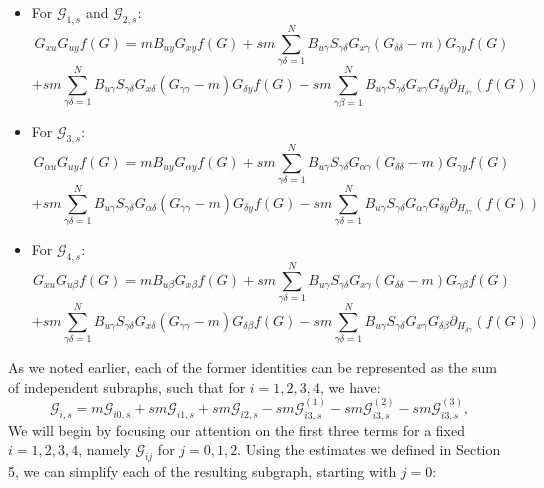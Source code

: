 \documentclass[11pt]{article}
\begin{document}
\begin{itemize}
\item For $\mathcal{G}_{1, s}$ and $\mathcal{G}_{2, s}$: \begin{equation*}
G_{xu}G_{uy}f(G) = mB_{uy}G_{xy} f(G) + sm\sum_{\gamma\delta=1}^N B_{u\gamma} S_{\gamma\delta} G_{x\gamma}(G_{\delta\delta}-m)G_{\gamma y} f(G)
\end{equation*}
$$+sm\sum_{\gamma\delta=1}^N B_{u\gamma} S_{\gamma\delta} G_{x\delta}(G_{\gamma\gamma}-m)G_{\delta y}f(G)-sm\sum_{\gamma\beta=1}^N B_{u\gamma}S_{\gamma\delta}G_{x\gamma}G_{\delta y}\partial_{H_{\delta \gamma}}(f(G))$$
\item For $\mathcal{G}_{3, s}$:
\begin{equation*}
G_{\alpha u}G_{uy}f(G) = mB_{uy}G_{\alpha y} f(G) + sm\sum_{\gamma\delta=1}^N B_{u\gamma} S_{\gamma\delta} G_{\alpha\gamma}(G_{\delta\delta}-m)G_{\gamma y} f(G)
\end{equation*}
$$+sm\sum_{\gamma\delta=1}^N B_{u\gamma} S_{\gamma\delta} G_{\alpha\delta}(G_{\gamma\gamma}-m)G_{\delta y}f(G)-sm\sum_{\gamma\delta=1}^N B_{u\gamma}S_{\gamma\delta}G_{\alpha\gamma}G_{\delta y}\partial_{H_{\delta \gamma}}(f(G))$$
\item For $\mathcal{G}_{4, s}$:
\begin{equation*}
G_{xu}G_{u\beta}f(G) = mB_{u\beta}G_{x\beta} f(G) + sm\sum_{\gamma\delta=1}^N B_{u\gamma} S_{\gamma\delta} G_{x\gamma}(G_{\delta\delta}-m)G_{\gamma \beta} f(G)
\end{equation*}
$$+sm\sum_{\gamma\delta=1}^N B_{u\gamma} S_{\gamma\delta} G_{x\delta}(G_{\gamma\gamma}-m)G_{\delta \beta}f(G)-sm\sum_{\gamma\delta=1}^N B_{u\gamma}S_{\gamma\delta}G_{x\gamma}G_{\delta \beta}\partial_{H_{\delta \gamma}}(f(G))$$
\end{itemize}
As we noted earlier, each of the former identities can be represented as the sum of independent subraphs, such that for $i=1, 2, 3, 4$, we have:
$$\mathcal{G}_{i, s} = m\mathcal{G}_{i0, s}+sm\mathcal{G}_{i1,s}+sm\mathcal{G}_{i2, s}-sm\mathcal{G}_{i3,s}^{(1)}-sm\mathcal{G}_{i3,s}^{(2)}-sm\mathcal{G}_{i3,s}^{(3)},$$
We will begin by focusing our attention on the first three terms for a fixed $i=1, 2, 3, 4$, namely $\mathcal{G}_{ij}$ for $j=0, 1, 2$. Using the estimates we defined in Section 5, we can simplify each of the resulting subgraph, starting with $j=0$:\newpage
\end{document}
